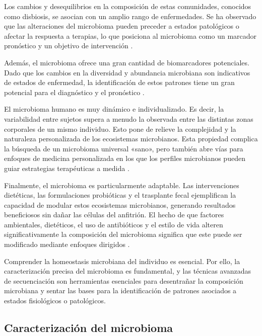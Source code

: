 Los cambios y desequilibrios en la composición de estas comunidades, conocidos como disbiosis, se asocian con un amplio rango de enfermedades. Se ha observado que las alteraciones del microbioma pueden preceder a estados patológicos o afectar la respuesta a terapias, lo que posiciona al microbioma como un marcador pronóstico y un objetivo de intervención \cite{das2019homeostasis}.

Además, el microbioma ofrece una gran cantidad de biomarcadores potenciales. Dado que los cambios en la diversidad y abundancia microbiana son indicativos de estados de enfermedad, la identificación de estos patrones tiene un gran potencial para el diagnóstico y el pronóstico \cite{lloyd2016healthy}.

El microbioma humano es muy dinámico e individualizado. Es decir, la variabilidad entre sujetos supera a menudo la observada entre las distintas zonas corporales de un mismo individuo. Esto pone de relieve la complejidad y la naturaleza personalizada de los ecosistemas microbianos. Esta propiedad complica la búsqueda de un microbioma universal «sano», pero también abre vías para enfoques de medicina personalizada en los que los perfiles microbianos pueden guiar estrategias terapéuticas a medida \cite{turnbaugh2007human}.

Finalmente, el microbioma es particularmente adaptable. Las intervenciones dietéticas, las formulaciones probióticas y el trasplante fecal ejemplifican la capacidad de modular estos ecosistemas microbianos, generando resultados beneficiosos sin dañar las células del anfitrión. El hecho de que factores ambientales, dietéticos, el uso de antibióticos y el estilo de vida alteren significativamente la composición del microbioma significa que este puede ser modificado mediante enfoques dirigidos \cite{zmora2019you}.


Comprender la homeostasis microbiana del individuo es esencial. Por ello, la caracterización precisa del microbioma es fundamental, y las técnicas avanzadas de secuenciación son herramientas esenciales para desentrañar la composición microbiana y sentar las bases para la identificación de patrones asociados a estados fisiológicos o patológicos.

\subsection{Caracterización del microbioma}

